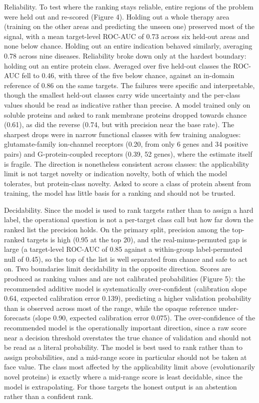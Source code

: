 \documentclass[11pt,twocolumn]{article}
\begin{document}
Reliability. To test where the ranking stays reliable, entire regions of the problem were held out and re-scored (Figure 4). Holding out a whole therapy area (training on the other areas and predicting the unseen one) preserved most of the signal, with a mean target-level ROC-AUC of 0.73 across six held-out areas and none below chance. Holding out an entire indication behaved similarly, averaging 0.78 across nine diseases. Reliability broke down only at the hardest boundary: holding out an entire protein class. Averaged over five held-out classes the ROC-AUC fell to 0.46, with three of the five below chance, against an in-domain reference of 0.86 on the same targets. The failures were specific and interpretable, though the smallest held-out classes carry wide uncertainty and the per-class values should be read as indicative rather than precise. A model trained only on soluble proteins and asked to rank membrane proteins dropped towards chance (0.61), as did the reverse (0.74, but with precision near the base rate). The sharpest drops were in narrow functional classes with few training analogues: glutamate-family ion-channel receptors (0.20, from only 6 genes and 34 positive pairs) and G-protein-coupled receptors (0.39, 52 genes), where the estimate itself is fragile. The direction is nonetheless consistent across classes: the applicability limit is not target novelty or indication novelty, both of which the model tolerates, but protein-class novelty. Asked to score a class of protein absent from training, the model has little basis for a ranking and should not be trusted.

Decidability. Since the model is used to rank targets rather than to assign a hard label, the operational question is not a per-target class call but how far down the ranked list the precision holds. On the primary split, precision among the top-ranked targets is high (0.95 at the top 20), and the real-minus-permuted gap is large (a target-level ROC-AUC of 0.85 against a within-group label-permuted null of 0.45), so the top of the list is well separated from chance and safe to act on. Two boundaries limit decidability in the opposite direction. Scores are produced as ranking values and are not calibrated probabilities (Figure 5): the recommended additive model is systematically over-confident (calibration slope 0.64, expected calibration error 0.139), predicting a higher validation probability than is observed across most of the range, while the opaque reference under-forecasts (slope 0.90, expected calibration error 0.075). The over-confidence of the recommended model is the operationally important direction, since a raw score near a decision threshold overstates the true chance of validation and should not be read as a literal probability. The model is best used to rank rather than to assign probabilities, and a mid-range score in particular should not be taken at face value. The class most affected by the applicability limit above (evolutionarily novel proteins) is exactly where a mid-range score is least decidable, since the model is extrapolating. For those targets the honest output is an abstention rather than a confident rank.
\end{document}
